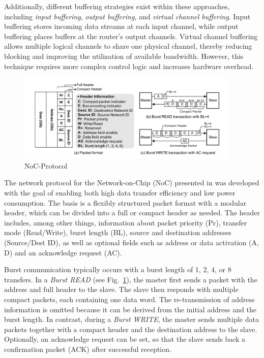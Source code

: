 Additionally, different buffering strategies exist within these approaches, including \textit{input buffering}, \textit{output buffering}, and \textit{virtual channel buffering}. Input buffering stores incoming data streams at each input channel, while output buffering places buffers at the router’s output channels. Virtual channel buffering allows multiple logical channels to share one physical channel, thereby reducing blocking and improving the utilization of available bandwidth. However, this technique requires more complex control logic and increases hardware overhead.\cite{dally_principles_2004}

\begin{figure}[htbp]
    \centering
    \includegraphics[width=0.95\textwidth]{img/NoC Protocol.png}
    \caption{NoC-Protocol~\cite{lee_low-power_2006}}\label{fig:NOC_Protocol}
\end{figure}


The network protocol for the Network-on-Chip (NoC) presented in \cite{lee_low-power_2006} was developed with the goal of enabling both high data transfer efficiency and low power consumption. The basis is a flexibly structured packet format with a modular header, which can be divided into a full or compact header as needed. The header includes, among other things, information about packet priority (Pr), transfer mode (Read/Write), burst length (BL), source and destination addresses (Source/Dest ID), as well as optional fields such as address or data activation (A, D) and an acknowledge request (AC).

Burst communication typically occurs with a burst length of 1, 2, 4, or 8 transfers. In a \emph{Burst READ} (see Fig.~\ref{fig:NOC_Protocol}), the master first sends a packet with the address and full header to the slave. The slave then responds with multiple compact packets, each containing one data word. The re-transmission of address information is omitted because it can be derived from the initial address and the burst length. In contrast, during a \emph{Burst WRITE}, the master sends multiple data packets together with a compact header and the destination address to the slave. Optionally, an acknowledge request can be set, so that the slave sends back a confirmation packet (ACK) after successful reception.


